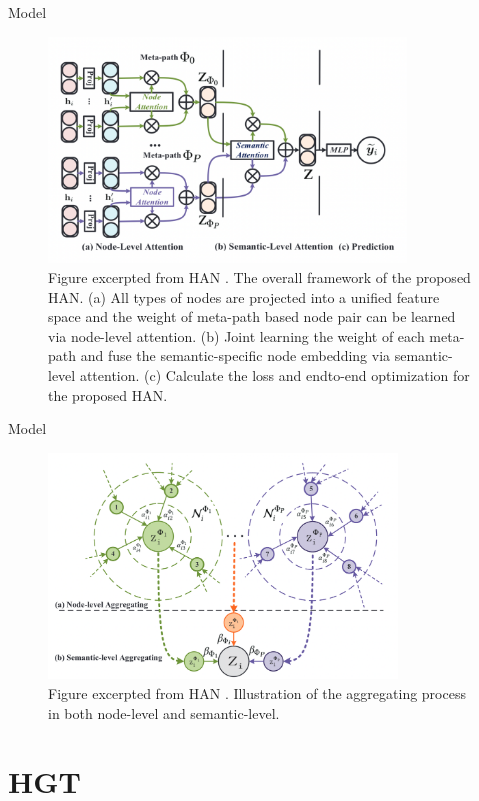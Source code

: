 \documentclass[aspectratio=1610,xcolor={dvipsnames},hyperref={colorlinks,unicode,linkcolor=violet,anchorcolor=blueviolet,citecolor=YellowOrange,filecolor=black,urlcolor=Aquamarine}]{beamer}
\begin{document}
\begin{frame}[label={sec:org797290f}]{Model}
\begin{figure}[htbp]
\centering
\includegraphics[height=6cm]{./p5.png}
\caption{\footnotesize Figure excerpted from HAN \autocite{wangHeterogeneousGraphAttention2019}. The overall framework of the proposed HAN. (a) All types of nodes are projected into a unified feature space and the weight of meta-path based node pair can be learned via node-level attention. (b) Joint learning the weight of each meta-path and fuse the semantic-specific node embedding via semantic-level attention. (c) Calculate the loss and endto-end optimization for the proposed HAN.}
\end{figure}
\end{frame}

\begin{frame}[label={sec:orgd11dd5c}]{Model}
\begin{figure}[htbp]
\centering
\includegraphics[height=6cm]{./p4.png}
\caption{\small Figure excerpted from HAN \autocite{wangHeterogeneousGraphAttention2019}. Illustration of the aggregating process in both node-level and semantic-level.}
\end{figure}
\end{frame}

\section{HGT}
\label{sec:org4f1fecc}
\end{document}
